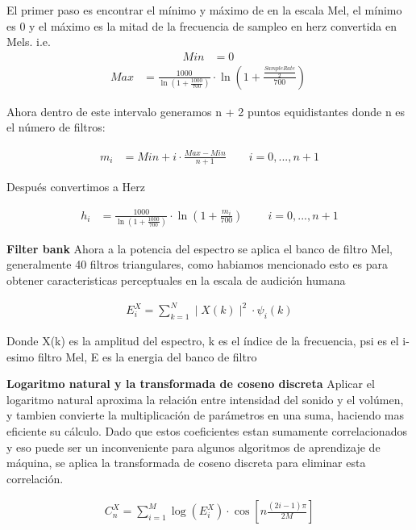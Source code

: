 El primer paso es encontrar el mí­nimo y máximo de en la escala Mel, el mí­nimo es 0 y el máximo es la mitad de la frecuencia de sampleo en herz convertida en Mels. i.e.
\begin{align}
  Min &= 0\
\end{align}
\begin{align}
  Max &= \frac{1000}{\ln(1 + \frac{1000}{700})} \cdot  \ln{\left(1 + \frac{\frac{SampleRate}{2}}{700}\right)}\
\end{align}

Ahora dentro de este intervalo generamos n + 2 puntos equidistantes donde n es el número de filtros:

\begin{align}
  m_{i} &= Min + i \cdot \frac{Max - Min}{n + 1}  \qquad  i = 0, ..., n + 1
\end{align}

Despu\'es convertimos a Herz

\begin{align}
   h_{i} &= \frac{1000}{\ln(1 + \frac{1000}{700})} \cdot  \ln{\left(1 + \frac{m_{i}}{700}\right)}\ \qquad  i = 0, ..., n + 1
\end{align}



\textbf{Filter bank}
Ahora a la potencia del espectro se aplica el banco de filtro Mel, generalmente 40 filtros triangulares, como habiamos mencionado esto es para obtener caracteristicas perceptuales en la escala de audición humana

\begin{align}
   E^{X}_{i} = \sum_{k = 1}^{N} \mid X(k) \mid ^2  \cdot \psi_{i}(k)
\end{align}

Donde X(k) es la amplitud del espectro, k es el í­ndice de la frecuencia, psi es el i-esimo filtro Mel, E es la energia del banco de filtro

\textbf{Logaritmo natural y la transformada de coseno discreta}
Aplicar el logaritmo natural aproxima la relación entre intensidad del sonido y el volúmen, y tambien convierte la multiplicación de parámetros en una suma, haciendo mas eficiente su cálculo. Dado que estos coeficientes estan sumamente correlacionados y eso puede ser un inconveniente para algunos algoritmos de aprendizaje de máquina, se aplica la transformada de coseno discreta para eliminar esta correlación. 

\begin{align}
   C^{X}_{n} = \sum_{i = 1}^{M} \log(E^{X}_{i}) \cdot \cos[n \frac{(2i - 1)\pi}{2M}]
\end{align}

